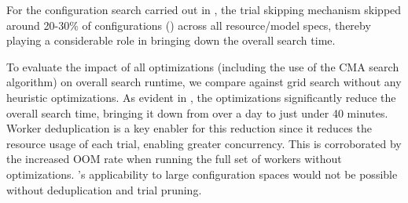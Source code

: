  For the configuration search carried out in , the trial skipping mechanism skipped around 20-30\% of configurations () across all resource/model specs, thereby playing a considerable role in bringing down the overall search time.



 To evaluate the impact of all optimizations (including the use of the CMA search algorithm) on overall search runtime, we compare against grid search without any heuristic optimizations. As evident in , the optimizations significantly reduce the overall search time, bringing it down from over a day to just under 40 minutes. Worker deduplication is a key enabler for this reduction since it reduces the resource usage of each trial, enabling greater concurrency. This is corroborated by the increased OOM rate when running the full set of workers without optimizations. \sysname's applicability to large configuration spaces would not be possible without deduplication and trial pruning.
